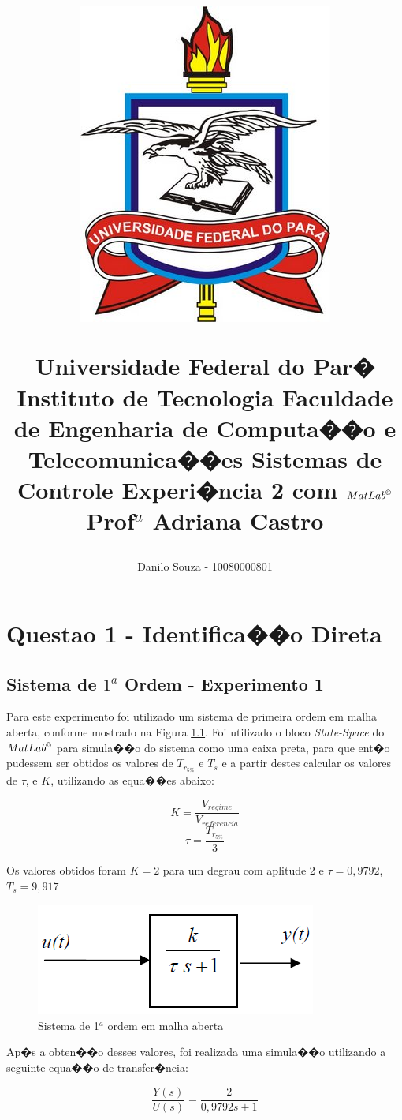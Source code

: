 \documentclass[11pt,a4paper]{report}
\title{	\begin{figure}[h]
			\centering
			\includegraphics[scale=0.75]{./pictures/logoufpa.png}
			\label{fig:logoufpa}
		\end{figure}
		Universidade Federal do Par� \linebreak
		Instituto de Tecnologia \linebreak
		Faculdade de Engenharia de Computa��o e Telecomunica��es \linebreak
		Sistemas de Controle \linebreak
		Experi�ncia 2 com $MatLab^{\copyright}$ \linebreak
		Prof$^{a}$ Adriana Castro}
\begin{document}
\author{Danilo Souza - 10080000801}
\maketitle

\tableofcontents
\listoffigures

\chapter{Questao 1 - Identifica��o Direta}

\section{Sistema de $1^{a}$ Ordem - Experimento 1}

	Para este experimento foi utilizado um sistema de primeira ordem em malha aberta, conforme mostrado na Figura \ref{fig:sist1ordaberta}. Foi utilizado o bloco \textit{State-Space} do $MatLab^{\copyright}$ para simula��o do sistema como uma caixa preta, para que ent�o pudessem ser obtidos os valores de $T_{r_{5\%}}$ e $T_{s}$ e a partir destes calcular os valores de $\tau$, e $K$, utilizando as equa��es abaixo:
	
	\[K = \frac{V_{regime}}{V_{referencia}}\]  \[\tau = \frac{T_{r_{5\%}}}{3} \]
	
	Os valores obtidos foram $K = 2$ para um degrau com aplitude 2 e $\tau = 0,9792$, $T_{s} = 9,917$

		\begin{figure}[h]
			\centering
			\includegraphics[scale=0.75]{./pictures/sistema_1ordem_aberta.png}
			\caption{Sistema de 1$^{a}$ ordem em malha aberta}
			\label{fig:sist1ordaberta}			
		\end{figure}
	
	Ap�s a obten��o desses valores, foi realizada uma simula��o utilizando a seguinte equa��o de transfer�ncia:
	
	\[ \frac{Y(s)}{U(s)} = \frac{2}{0,9792s +1} \]
	
\end{document}
